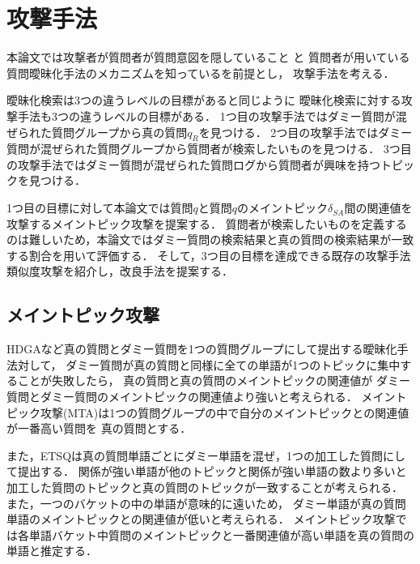 \documentclass[master]{suribt}
\theoremstyle{definition}
\newcommand{\argmax}{\mathop{\rm argmax}\limits}
\begin{document}
 \chapter{攻撃手法}
 本論文では攻撃者が質問者が質問意図を隠していること
 と
 質問者が用いている質問曖昧化手法のメカニズムを知っているを前提とし，
 攻撃手法を考える．

 曖昧化検索は3つの違うレベルの目標があると同じように
 曖昧化検索に対する攻撃手法も3つの違うレベルの目標がある．
 1つ目の攻撃手法ではダミー質問が混ぜられた質問グループから真の質問$q_R$を見つける．
 2つ目の攻撃手法ではダミー質問が混ぜられた質問グループから質問者が検索したいものを見つける．
 3つ目の攻撃手法ではダミー質問が混ぜられた質問ログから質問者が興味を持つトピックを見つける．

 1つ目の目標に対して本論文では質問$q$と質問$q$のメイントピック$\delta_{SA}$間の関連値を攻撃するメイントピック攻撃を提案する．
 質問者が検索したいものを定義するのは難しいため，本論文ではダミー質問の検索結果と真の質問の検索結果が一致する割合を用いて評価する．
 そして，3つ目の目標を達成できる既存の攻撃手法類似度攻撃\cite{simattack2016}を紹介し，改良手法を提案する．

 \section{メイントピック攻撃}\label{s:MTA}
 HDGAなど真の質問とダミー質問を1つの質問グループにして提出する曖昧化手法対して，
 ダミー質問が真の質問と同様に全ての単語が1つのトピックに集中することが失敗したら，
 真の質問と真の質問のメイントピックの関連値が
 ダミー質問とダミー質問のメイントピックの関連値より強いと考えられる．
 メイントピック攻撃(MTA)は1つの質問グループの中で自分のメイントピックとの関連値が一番高い質問を
 真の質問とする．

 また，ETSQは真の質問単語ごとにダミー単語を混ぜ，1つの加工した質問にして提出する．
 関係が強い単語が他のトピックと関係が強い単語の数より多いと
 加工した質問のトピックと真の質問のトピックが一致することが考えられる．
 また，一つのバケットの中の単語が意味的に遠いため，
 ダミー単語が真の質問単語のメイントピックとの関連値が低いと考えられる．
 メイントピック攻撃では各単語バケット中質問のメイントピックと一番関連値が高い単語を真の質問の単語と推定する．

\end{document}
